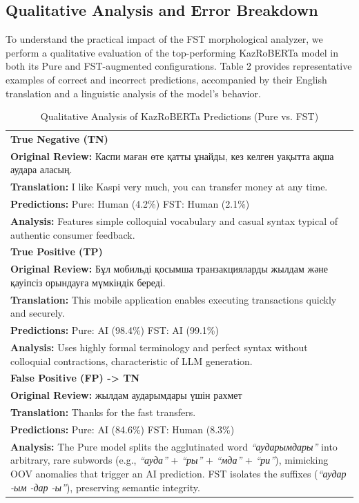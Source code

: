 \documentclass[runningheads]{llncs}
\begin{document}
\subsection{Qualitative Analysis and Error Breakdown}
To understand the practical impact of the FST morphological analyzer, we perform a qualitative evaluation of the top-performing KazRoBERTa model in both its Pure and FST-augmented configurations. Table 2 provides representative examples of correct and incorrect predictions, accompanied by their English translation and a linguistic analysis of the model's behavior.
\begin{table}
\caption{Qualitative Analysis of KazRoBERTa Predictions (Pure vs. FST)}
\label{tab:table2}
\centering
\footnotesize
\begin{tabular}{p{11.8cm}}
\toprule
\textbf{True Negative (TN)} \\
\smallskip
\textbf{Original Review:} Каспи маған өте қатты ұнайды, кез келген уақытта ақша аудара аласың. \\
\textbf{Translation:} I like Kaspi very much, you can transfer money at any time. \\
\textbf{Predictions:} Pure: Human (4.2\%) \hfill FST: Human (2.1\%) \\
\textbf{Analysis:} Features simple colloquial vocabulary and casual syntax typical of authentic consumer feedback. \\
\midrule
\textbf{True Positive (TP)} \\
\smallskip
\textbf{Original Review:} Бұл мобильді қосымша транзакцияларды жылдам және қауіпсіз орындауға мүмкіндік береді. \\
\textbf{Translation:} This mobile application enables executing transactions quickly and securely. \\
\textbf{Predictions:} Pure: AI (98.4\%) \hfill FST: AI (99.1\%) \\
\textbf{Analysis:} Uses highly formal terminology and perfect syntax without colloquial contractions, characteristic of LLM generation. \\
\midrule
\textbf{False Positive (FP) -> TN} \\
\smallskip
\textbf{Original Review:} жылдам аударымдары үшін рахмет \\
\textbf{Translation:} Thanks for the fast transfers. \\
\textbf{Predictions:} Pure: AI (84.6\%) \hfill FST: Human (8.3\%) \\
\textbf{Analysis:} The Pure model splits the agglutinated word \textit{``аударымдары''} into arbitrary, rare subwords (e.g., \textit{``ауда''} + \textit{``ры''} + \textit{``мда''} + \textit{``ри''}), mimicking OOV anomalies that trigger an AI prediction. FST isolates the suffixes (\textit{``аудар -ым -дар -ы''}), preserving semantic integrity. \\

\end{tabular}
\end{table}
\end{document}
